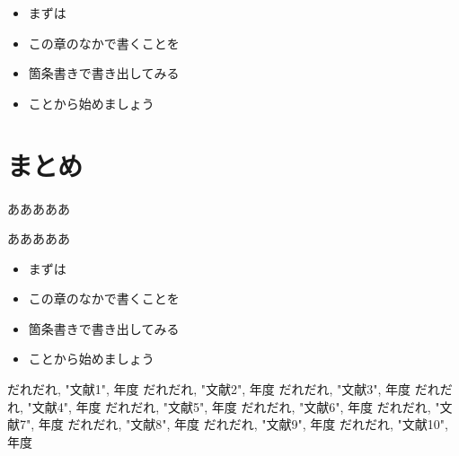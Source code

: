 \documentclass[a4j]{jarticle}
\begin{document}
\begin{itemize}
\item まずは
\item この章のなかで書くことを
\item 箇条書きで書き出してみる
\item ことから始めましょう
\end{itemize}

\newpage
\section{まとめ}
あああああ

あああああ

\begin{itemize}
\item まずは
\item この章のなかで書くことを
\item 箇条書きで書き出してみる
\item ことから始めましょう
\end{itemize}	



\newpage
\begin{thebibliography}{99}
だれだれ, "文献1", 年度
だれだれ, "文献2", 年度
だれだれ, "文献3", 年度
だれだれ, "文献4", 年度
だれだれ, "文献5", 年度
だれだれ, "文献6", 年度
だれだれ, "文献7", 年度
だれだれ, "文献8", 年度
だれだれ, "文献9", 年度
だれだれ, "文献10", 年度

\end{thebibliography}
\end{document}
